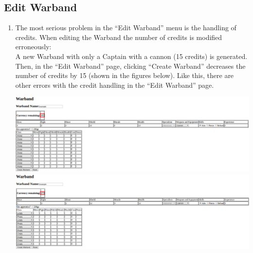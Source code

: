 \documentclass[12pt,a4paper]{article}
\begin{document}
\subsection{Edit Warband}

\begin{enumerate}
 \item The most serious problem in the ``Edit Warband'' menu is the handling of credits. When editing the Warband the number of credits is modified erroneously:\\
 A new Warband with only a Captain with a cannon (15 credits) is generated. Then, in the ``Edit Warband'' page, clicking ``Create Warband'' decreases the number of credits by 15 (shown in the figures below). Like this, there are other errors with the credit handling in the ``Edit Warband'' page.\\
 \begin{minipage}[t]{\linewidth}
 \centering
 \includegraphics[width=1\textwidth]{img/example00}
 \includegraphics[width=1\textwidth]{img/example01}
 \end{minipage}
 

\end{enumerate}
\end{document}
